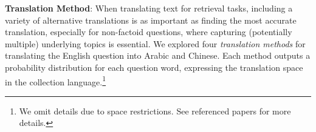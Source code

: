 \documentclass{sig-alternate-05-2015}
\begin{document}
\textbf{Translation Method}:
When translating text for retrieval tasks, including a variety of alternative translations is as important as finding the most accurate 
translation, especially for non-factoid questions, where capturing (potentially multiple) underlying topics is essential.
We explored four \emph{translation methods} for translating
the English question into Arabic and Chinese. Each method outputs a probability distribution for 
each question word, expressing the translation space in the collection language.\footnote{We omit details due to space 
restrictions. See referenced papers for more details.}

\end{document}
